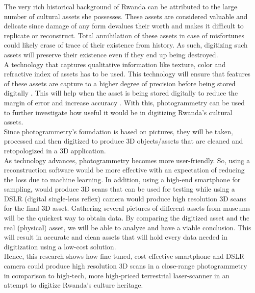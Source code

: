 \documentclass[a4paper, 12pt]{article}
\begin{document}
The very rich historical background of Rwanda can be attributed to the large number of cultural assets she possesses. These assets are considered valuable and
delicate since damage of any form devalues their worth and makes it difficult to replicate or reconstruct. Total annihilation of these assets in case of misfortunes
could likely erase of trace of their existence from history. As such, digitizing such assets will preserve their existence even if they end up being destroyed. \\

A technology that captures qualitative information like texture, color and refractive index of assets has to be used. This technology will ensure that features
of these assets are capture to a higher degree of precision before being stored digitally \cite{Linder2006}. This will help when
the asset is being stored digitally to reduce the margin of error and increase accuracy \cite{accphtgm}. With this, photogrammetry can be used to further
investigate how useful it would be in digitizing Rwanda's cultural assets. \\

Since photogrammetry's foundation is based on pictures, they will be taken, processed and then digitized to produce 3D objects/assets that are cleaned and retopologized in
a 3D application. \\

As technology advances, photogrammetry becomes more user-friendly. So, using a reconstruction software
would be more effective with an expectation of reducing the loss due to machine learning. In addition, using a high-end smartphone for sampling, would produce 3D scans that can be used for testing while using a DSLR (digital single-lens reflex) camera would produce high resolution 3D scans for the final 3D asset. Gathering several pictures of different assets from museums will be the quickest way to obtain data. By comparing the digitized
asset and the real (physical) asset, we will be able to analyze and have a viable conclusion. This will result in accurate and clean assets that will
hold every data needed in digitization using a low-cost solution. \\

Hence, this research shows how fine-tuned, cost-effective smartphone and DSLR camera could produce high resolution 3D scans in a close-range photogrammetry in comparison to high-tech, more high-priced terrestrial laser-scanner in an attempt to digitize Rwanda's culture heritage.
\end{document}
